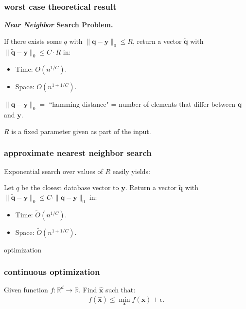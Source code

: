 \documentclass[compress]{beamer}
\newcommand{\bv}[1]{\mathbf{#1}}
\newcommand{\R}{\mathbb{R}}
\begin{document}
\begin{frame}
	\frametitle{worst case theoretical result}
	\begin{center}
	\textbf{\emph{Near Neighbor} Search Problem.}
\end{center}
	\begin{theorem}
		If there exists some $q$ with $\|\bv{q} - \bv{y}\|_0 \leq R$, return a vector $\tilde{\bv{q}}$ with $\|\tilde{\bv{q}} - \bv{y}\|_0 \leq C\cdot R$ in:
		\begin{itemize}
			\item Time: $O\left(n^{1/C}\right)$.
			\item Space: $O\left(n^{1 + 1/C}\right)$. 
		\end{itemize}
	\end{theorem}
	$\|\bv{q} - \bv{y}\|_0 = $ ``hamming distance" = number of elements that differ between $\bv{q}$ and $\bv{y}$. 

	$R$ is a fixed parameter given as part of the input.
\end{frame}

\begin{frame}
	
	\frametitle{approximate nearest neighbor search}
	Exponential search over values of $R$ easily yields:  
		\begin{theorem}
		Let $q$ be the closest database vector to $\bv{y}$. Return a vector $\tilde{\bv{q}}$ with $\|\tilde{\bv{q}} - \bv{y}\|_0 \leq C\cdot \|{\bv{q}} - \bv{y}\|_0$ in:
		\begin{itemize}
			\item Time: $\tilde{O}\left(n^{1/C}\right)$.
			\item Space: $\tilde{O}\left(n^{1 + 1/C}\right)$. 
		\end{itemize}
	\end{theorem}
\end{frame}


\begin{frame}[standout]
	\begin{center}
		optimization
	\end{center}
\end{frame}


\begin{frame}
		\frametitle{continuous optimization}
		Given function $f: \R^d \rightarrow \R$. Find $\hat{\bv{x}}$ such that: 
		\begin{align*}
			f(\hat{\bv{x}}) \leq \min_{\bv{x}}f(\bv{x}) + \epsilon.
		\end{align*}
\end{frame}
\end{document}
